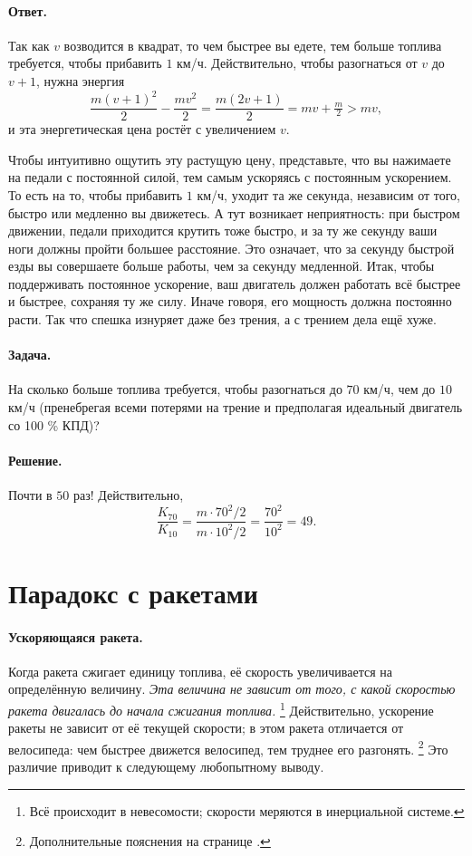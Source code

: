 \paragraph{Ответ.}\label{Ответ:Как почувствовать квадрат}
Так как $v$ возводится в квадрат, то чем быстрее вы едете,
тем больше топлива требуется, чтобы прибавить $1$ км/ч.
Действительно, чтобы разогнаться от $v$ до $v+1$, нужна энергия
\[
\frac{m(v+1)^2}{2} - \frac{mv^2}{2}
   = \frac{m(2v+1)}{2}
   = mv + \tfrac{m}{2} > mv,
\]
и эта энергетическая цена ростёт с увеличением $v$.

Чтобы интуитивно ощутить эту растущую цену, представьте, что вы нажимаете на педали с постоянной силой, тем самым ускоряясь с постоянным ускорением.
То есть на то, чтобы прибавить $1$ км/ч, уходит та же секунда, независим от того, быстро или медленно вы движетесь.
А тут возникает неприятность:
при быстром движении, педали приходится крутить тоже быстро, и за ту же секунду ваши ноги должны пройти большее расстояние.
Это означает, что за секунду быстрой езды вы совершаете больше работы, чем за секунду медленной.
Итак, чтобы поддерживать постоянное ускорение, ваш двигатель должен работать всё быстрее и быстрее, сохраняя ту же силу.
Иначе говоря, его мощность должна постоянно расти.
Так что спешка изнуряет даже без трения, а с трением дела ещё хуже.

\paragraph{Задача.}
На сколько больше топлива требуется,
чтобы разогнаться до $70$ км/ч, чем до $10$ км/ч
(пренебрегая всеми потерями на трение и предполагая идеальный двигатель со 100 \% КПД)?

\paragraph{Решение.}
Почти в $50$ раз!
Действительно,
\[
\frac{K_{70}}{K_{10}}
  = \frac{m \cdot 70^2/2}{m \cdot 10^2/2}
  = \frac{70^2}{10^2}
  = 49.
\]

\section{Парадокс с ракетами}

\paragraph{Ускоряющаяся ракета.}
Когда ракета сжигает единицу топлива, её скорость увеличивается на определённую величину.
\emph{Эта величина не зависит от того, с какой скоростью ракета двигалась до начала сжигания топлива.}%
\footnote{Всё происходит в невесомости; скорости меряются в инерциальной системе.}
Действительно, ускорение ракеты не зависит от её текущей скорости;
в этом ракета отличается от велосипеда: чем быстрее движется велосипед, тем труднее его разгонять.%
\footnote{Дополнительные пояснения на странице \pageref{Ответ:Как почувствовать квадрат}.}
Это различие приводит к следующему любопытному выводу.

